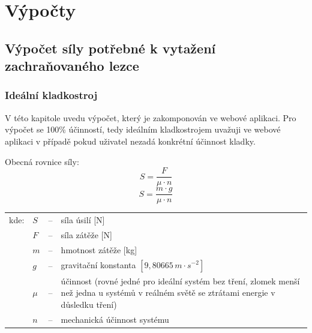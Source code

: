 \chapter{Výpočty}
\label{Vypocty}
\def\figurename{Obr.} %
\def\tablename{Tab.} %
\def\figureautorefname{obr.} %
\def\tableautorefname{tab.} %
\def\chapterautorefname{kapitola} %

\section{Výpočet síly potřebné k vytažení zachraňovaného lezce}
\subsection{Ideální kladkostroj}
V této kapitole uvedu výpočet, který je zakomponován ve webové aplikaci. Pro výpočet se 100\% účinností, tedy ideálním kladkostrojem uvažuji ve webové aplikaci v případě pokud uživatel nezadá konkrétní účinnost kladky.

\noindent Obecná rovnice síly:
\begin{equation}
    \label{eqn:basic_forces}
    S = \frac{F}{\mu \cdot n}
\end{equation}
\begin{equation}
    \label{eqn:basic_forces_2}
    S = \frac{m \cdot g}{\mu \cdot n}
\end{equation}

\begin{tabular}{l l c p{9.75cm}}
    kde: \hspace{0.25cm} & $S$ & -- & síla úsilí [N]\\
    \hspace{0.25cm} & $F$ & -- & síla zátěže [N]\\
    \hspace{0.25cm} & $m$ & -- & hmotnost zátěže [kg]\\
    \hspace{0.25cm} & $g$ & -- & gravitační konstanta $[9,80665\,m \cdot s^{-2}]$\\
    \hspace{0.25cm} & $\mu$ & -- & účinnost (rovné jedné pro ideální systém bez tření, zlomek menší než jedna u systémů v reálném světě se ztrátami energie v důsledku tření)\\
    \hspace{0.25cm} & $n$ & -- & mechanická účinnost systému\\
\end{tabular}
\\
